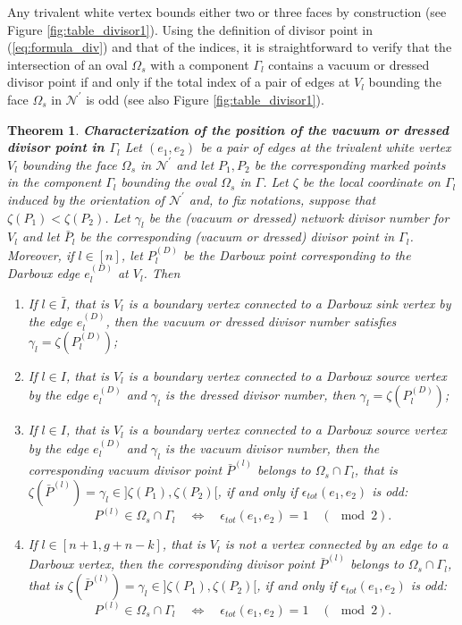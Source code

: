 \documentclass[11pt]{amsart}
\theoremstyle{plain}
\numberwithin{equation}{section}
\newtheorem{theorem}{Theorem}[subsection]
\begin{document}
Any trivalent white vertex bounds either two or three faces by construction (see Figure \ref{fig:table_divisor1}).
Using the definition of divisor point in (\ref{eq:formula_div}) and that of the indices, it is straightforward to verify that the intersection of an oval $\Omega_s$ with a component $\Gamma_l$ contains a vacuum or dressed divisor point if and only if the total index of a pair of edges at $V_l$ bounding the face $\Omega_s$ in ${\mathcal N}^{\prime}$ is odd (see also Figure \ref{fig:table_divisor1}). 

\begin{theorem}\label{theo:pos_div}\textbf{Characterization of the position of the vacuum or dressed divisor point in $\Gamma_l$}
Let $(e_1,e_2)$ be a pair of edges at the trivalent white vertex $V_l$ bounding the face $\Omega_s$ in ${\mathcal N}^{\prime}$ and let $P_1, P_2$ be the corresponding marked 
points in the component $\Gamma_l$ bounding the oval $\Omega_s$ in $\Gamma$. Let $\zeta$ be the local coordinate on $\Gamma_l$ induced by the 
orientation of ${\mathcal N}^{\prime}$ and, to fix notations, suppose that $\zeta(P_1)<\zeta(P_2)$. Let $\gamma_l$ be the (vacuum or dressed) network divisor number for $V_l$ and let $\bar P_l$ be the corresponding (vacuum or dressed) divisor point in $\Gamma_l$. Moreover, if $l\in [n]$, let $P^{(D)}_l$ be the Darboux point corresponding to the Darboux edge $e^{(D)}_l$ at $V_l$.
Then 
\begin{enumerate}
\item If $l\in \bar I$, that is $V_l$ is a boundary vertex connected to a Darboux sink vertex by the edge $e^{(D)}_l$, then the vacuum or dressed divisor number satisfies $\gamma_l =\zeta (P^{(D)}_l )$;
\item If $l\in I$, that is $V_l$ is a boundary vertex connected to a Darboux source vertex by the edge $e^{(D)}_l$ and $\gamma_l$ is the dressed divisor number, then $\gamma_l =\zeta (P^{(D)}_l)$; 
\item If $l\in I$, that is $V_l$ is a boundary vertex connected to a Darboux source vertex by the edge $e^{(D)}_l$ and $\gamma_l$ is the vacuum divisor number, then the corresponding vacuum divisor point $\bar P^{(l)}$ belongs to $\Omega_s\cap \Gamma_l$, that is $\zeta(\bar P^{(l)}) =\gamma_l \in ]\zeta(P_1), \zeta (P_2)[$, if and only 
if $\epsilon_{tot} (e_1,e_2)$ is odd:
\[
P^{(l)} \in \Omega_s	\cap \Gamma_l\quad \iff \quad \epsilon_{tot} (e_1,e_2) = 1 \quad
(\!\!\!\!\!\!\mod 2) .
\]
\item If $l\in [n+1, g+n-k]$, that is $V_l$ is not a vertex connected by an edge to a Darboux vertex, then
the corresponding divisor point $\bar P^{(l)}$ belongs to $\Omega_s\cap \Gamma_l$, that is $\zeta(\bar P^{(l)}) =\gamma_l \in ]\zeta(P_1), \zeta (P_2)[$, if and only 
if $\epsilon_{tot} (e_1,e_2)$ is odd:
\[
P^{(l)} \in \Omega_s	\cap \Gamma_l \quad \iff \quad \epsilon_{tot} (e_1,e_2) = 1 \quad
(\!\!\!\!\!\!\mod 2).
\]
\end{enumerate}
\end{theorem}
\end{document}
